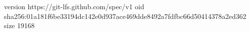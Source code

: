 version https://git-lfs.github.com/spec/v1
oid sha256:01a181f6be33194dc142e0d937ace469dde8492a7fdfbc66d50414378a2ed362
size 19168
